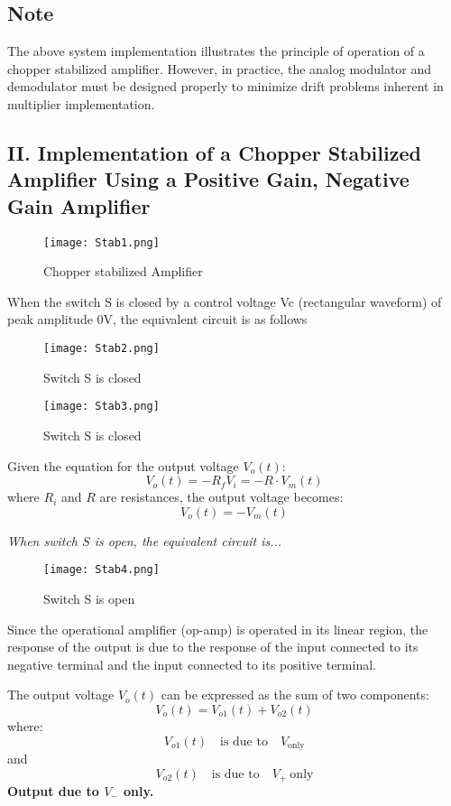 \documentclass[a4paper,9pt,twoside,openany,twocolumn]{memoir}
\begin{document}
\subsection{Note}
The above system implementation illustrates the principle of operation of a chopper stabilized amplifier. However, in practice, the analog modulator and demodulator must be designed properly to minimize drift problems inherent in multiplier implementation.

\subsection*{II. Implementation of a Chopper Stabilized Amplifier Using a Positive Gain, Negative Gain Amplifier}
\begin{figure}[h]
    \centering
    \texttt{[image: Stab1.png]}
    \caption{Chopper stabilized Amplifier}
\end{figure}
When the switch S is closed by a control voltage Vc (rectangular waveform) of peak amplitude 0V, the equivalent circuit is as follows
\begin{figure}[h]
    \centering
    \texttt{[image: Stab2.png]}
    \caption{Switch S is closed}
\end{figure}
\begin{figure}[h]
    \centering
    \texttt{[image: Stab3.png]}
    \caption{Switch S is closed}
\end{figure}
Given the equation for the output voltage \(V_o(t)\):
\[
V_o(t) = -R_f V_i = -R \cdot V_m(t)
\]
where \(R_i\) and \(R\) are resistances, the output voltage becomes:
\[
V_o(t) = -V_m(t)
\]

\textit{When switch \(S\) is open, the equivalent circuit is...}
\begin{figure}[h]
    \centering
    \texttt{[image: Stab4.png]}
    \caption{Switch S is open}
\end{figure}

Since the operational amplifier (op-amp) is operated in its linear region, the response of the output is due to the response of the input connected to its negative terminal and the input connected to its positive terminal.

The output voltage \( V_o(t) \) can be expressed as the sum of two components:
\[
V_o(t) = V_{o1}(t) + V_{o2}(t) \tag{1}
\]
where:
\[
V_{o1}(t) \quad \text{is due to} \quad V_{\text{only}} \tag{2}
\]
and
\[
V_{o2}(t) \quad \text{is due to} \quad V_{+} \ \text{only} \tag{3}
\]
\textbf{Output due to \( V_{-} \) only.}
\end{document}
